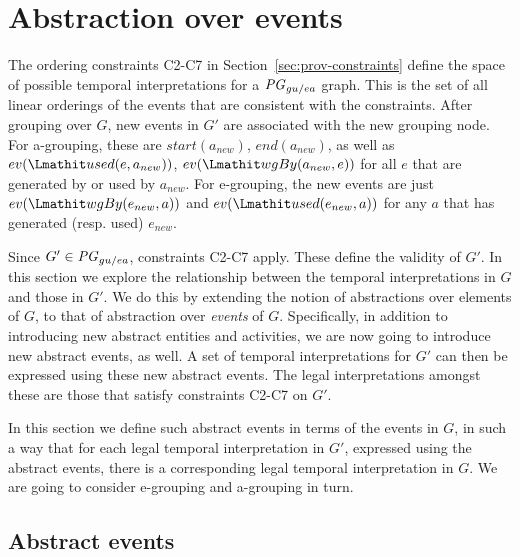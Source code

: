 
\section{Abstraction over events}
\label{sec:event}



%
The ordering constraints C2-C7 in Section~\ref{sec:prov-constraints} define the space of possible temporal interpretations for a $\mathit{PG}_{gu/ea}$ graph. This is the set of all linear orderings of the events that are consistent with the constraints. 
After grouping over $G$, new events in $G'$ are associated with the new grouping node. For a-grouping, these are
 $start(a_{new})$, $end(a_{new})$, as well as 
$ev(\used(e, a_{new}))$, $ev(\wgby(a_{new}, e))$ for all $e$ that are generated by or used by $a_{new}$. 
For e-grouping, the new events are just $ev(\wgby(e_{new}, a))$ and  $ev(\used(e_{new},a))$ for any $a$ that has generated (resp. used) $e_{new}$.

Since $G' \in \mathit{PG}_{gu/ea}$, constraints C2-C7 apply.
%
These define the validity of $G'$.
%
%
In this section we explore the relationship between the temporal interpretations in $G$ and those in $G'$. We do this by extending the notion of abstractions over elements of $G$, to that of abstraction over \textit{events} of $G$. 
%
Specifically, in addition to introducing new abstract entities and activities, we are now going to introduce new abstract events, as well. 
%
A set of temporal interpretations for $G'$ can then be expressed using these new abstract events. The legal interpretations amongst these are those that satisfy constraints C2-C7 on $G'$.
%

%
In this section we define such abstract events in terms of the events in $G$, in such a way that for each legal temporal interpretation in $G'$, expressed using the abstract events, there is a corresponding legal temporal interpretation in $G$.
%
We are going to consider e-grouping and a-grouping in turn.

\subsection{Abstract events}


